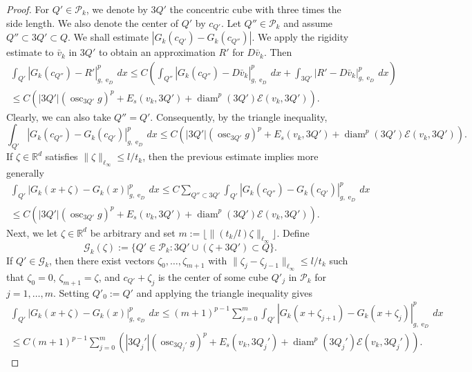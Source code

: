 \documentclass{article}
\numberwithin{equation}{section}
\theoremstyle{definition}
\theoremstyle{remark}
\DeclareMathOperator{\diam}{diam}
\DeclareMathOperator{\e}{e}
\DeclareMathOperator*{\osc}{osc}
\begin{document}
\begin{proof}
    For $Q' \in \mathcal{P}_k$, we denote by $3Q'$ the concentric cube with three times the side length. We also denote the center of $Q'$ by $c_{Q'}$. Let $Q'' \in \mathcal{P}_k$ and assume $Q'' \subset 3Q' \subset Q$. We shall estimate $|G_k(c_{Q'}) - G_k(c_{Q''})|$. We apply the rigidity estimate to $\bar{v}_k$ in $3Q'$ to obtain an approximation $R'$ for $D\bar{v}_k$. Then
    \begin{multline*}
        \int_{Q'} |G_k(c_{Q''}) - R'|_{g, \e_D}^p \, dx \le C \left(\int_{Q''} |G_k(c_{Q''}) - D\bar{v}_k|_{g, \e_D}^p \, dx + \int_{3Q'} |R' - D\bar{v}_k|_{g, \e_D}^p \, dx\right) \\
        \le C\left(|3Q'| \left(\osc_{3Q'} g\right)^p + E_s(v_k, 3Q') + \diam^p(3Q') \mathcal{E}(v_k, 3Q')\right).
    \end{multline*}
    Clearly, we can also take $Q'' = Q'$. Consequently, by the triangle inequality,
    \[ 
    \int_{Q'} |G_k(c_{Q''}) - G_k(c_{Q'})|_{g, \e_D}^p \, dx \le C \left(|3Q'| \left(\osc_{3Q'} g\right)^p + E_s(v_k, 3Q') + \diam^p(3Q') \mathcal{E}(v_k, 3Q')\right).
    \]
    If $\zeta \in \mathbb{R}^d$ satisfies $\|\zeta\|_{\ell_\infty} \le l/t_k$, then the previous estimate implies more generally
    \begin{multline} \label{eq:simple_translation_vector}
        \int_{Q'} |G_k(x + \zeta) - G_k(x)|_{g, \e_D}^p \, dx \le C \sum_{Q'' \subset 3Q'} \int_{Q'} |G_k(c_{Q''}) - G_k(c_{Q'})|_{g, \e_D}^p \, dx \\
        \le C\left(|3Q'| \left(\osc_{3Q'} g\right)^p + E_s(v_k, 3Q') + \diam^p(3Q') \mathcal{E}(v_k, 3Q')\right).
    \end{multline}
    Next, we let $\zeta \in \mathbb{R}^d$ be arbitrary and set $m := \lfloor\|(t_k/l) \zeta\|_{\ell_\infty}\rfloor$. Define 
    \[
    \mathcal{G}_k(\zeta) := \{Q' \in \mathcal{P}_k : 3Q' \cup (\zeta + 3Q') \subset Q\}.
    \]
    If $Q' \in \mathcal{G}_k$, then there exist vectors $\zeta_0, \dots, \zeta_{m + 1}$ with $\|\zeta_j - \zeta_{j - 1}\|_{\ell_\infty} \le l/t_k$ such that $\zeta_0 = 0$, $\zeta_{m + 1} = \zeta$, and  $c_{Q'} + \zeta_j$ is the center of some cube $Q'_j$ in $\mathcal{P}_k$ for $j = 1, \dots, m$. Setting $Q'_0 := Q'$ and applying the triangle inequality gives
    \begin{multline} \label{eq:general_translation_vector}
        \int_{Q'} |G_k(x + \zeta) - G_k(x)|_{g, \e_D}^p \, dx \le (m + 1)^{p - 1} \sum_{j = 0}^m \int_{Q'} |G_k(x + \zeta_{j + 1}) - G_k(x + \zeta_j)|_{g, \e_D}^p \, dx \\
        \le C (m + 1)^{p - 1}\sum_{j = 0}^m \left(|3Q_j'| \left(\osc_{3Q_j'} g\right)^p + E_s(v_k, 3Q_j') + \diam^p(3Q_j') \mathcal{E}(v_k, 3Q_j')\right).

\end{multline}
\end{proof}
\end{document}
